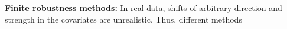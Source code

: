 \textbf{Finite robustness methods:} 
In real data, shifts of arbitrary direction and strength in the covariates are unrealistic. Thus, different methods \citep{rothenhausler2021anchor, jakobsen2022distributional, kook2022distributional, shen2023causalityoriented, christiansen2021causal}
